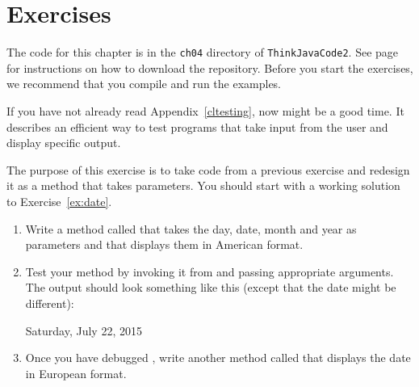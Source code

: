 \section{Exercises}

The code for this chapter is in the {\tt ch04} directory of {\tt ThinkJavaCode2}.
See page~\pageref{code} for instructions on how to download the repository.
Before you start the exercises, we recommend that you compile and run the examples.

If you have not already read Appendix~\ref{cltesting}, now might be a good time.
It describes an efficient way to test programs that take input from the user and display specific output.


\begin{exercise}  %

The purpose of this exercise is to take code from a previous exercise and redesign it as a method that takes parameters.
You should start with a working solution to Exercise~\ref{ex:date}.

\begin{enumerate}

\item Write a method called  that takes the day, date, month and year as parameters and that displays them in American format.

\item Test your method by invoking it from  and passing appropriate arguments.
The output should look something like this (except that the date might be different):

\begin{stdout}
Saturday, July 22, 2015
\end{stdout}

\item Once you have debugged , write another method called  that displays the date in European format.

\end{enumerate}

\end{exercise}



